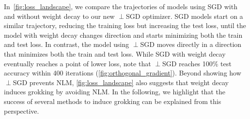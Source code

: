 In~\cref{fig:loss_landscape}, we compare the trajectories of models using SGD with and without weight decay to our new $\perp$SGD optimizer. SGD models start on a similar trajectory, reducing the training loss but increasing the test loss, until the model with weight decay changes direction and starts minimizing both the train and test loss. In contrast, the model using $\perp$SGD moves directly in a direction that minimizes both the train and test loss. While SGD with weight decay eventually reaches a point of lower loss, note that $\perp$SGD reaches 100\% test accuracy within 400 iterations (\cref{fig:orthogonal_gradient}). Beyond showing how $\perp$SGD prevents NLM, \cref{fig:loss_landscape} also suggests that weight decay induces grokking by avoiding NLM. In the following, we highlight that the success of several methods to induce grokking can be explained from this perspective.


